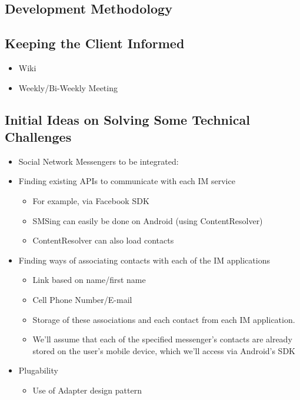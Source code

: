 

\subsection{Development Methodology}


\subsection{Keeping the Client Informed}
\begin{itemize}
    \item Wiki
    \item Weekly/Bi-Weekly Meeting
\end{itemize}
\subsection{Initial Ideas on Solving Some Technical Challenges}
\begin{itemize}
    \item Social Network Messengers to be integrated:
    \item Finding existing APIs to communicate with each IM service 
        \begin{itemize}
            \item For example, via Facebook SDK
            \item SMSing can easily be done on Android (using ContentResolver)
            \item ContentResolver can also load contacts
        \end{itemize}
    \item Finding ways of associating contacts with each of the IM applications
        \begin{itemize}
            \item Link based on name/first name
            \item Cell Phone Number/E-mail
            \item Storage of these associations and each contact from each IM application.
            \item We'll assume that each of the specified messenger's contacts are already stored on the user's mobile device, which we'll access via Android's SDK
        \end{itemize}
    \item Plugability
        \begin{itemize}
            \item Use of Adapter design pattern
        \end{itemize}
\end{itemize}
